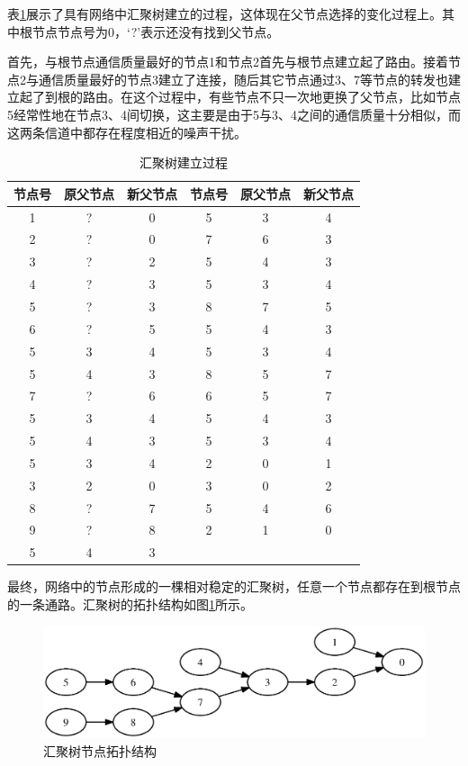 表\ref{ctp-tree-build}展示了具有网络中汇聚树建立的过程，这体现在父节点选择的变化过程上。其中根节点节点号为0，‘?’表示还没有找到父节点。

首先，与根节点通信质量最好的节点1和节点2首先与根节点建立起了路由。接着节点2与通信质量最好的节点3建立了连接，随后其它节点通过3、7等节点的转发也建立起了到根的路由。在这个过程中，有些节点不只一次地更换了父节点，比如节点5经常性地在节点3、4间切换，这主要是由于5与3、4之间的通信质量十分相似，而这两条信道中都存在程度相近的噪声干扰。
\vspace{-20pt}
\begin{table}[ht]
\wuhao
\centering
\caption{\hei 汇聚树建立过程}\label{ctp-tree-build}
\vspace{5pt}
\begin{tabular}{|c|c|c||c|c|c|}
\hline
节点号&原父节点&新父节点&节点号&原父节点&新父节点 \\
\hline
1&?&0& 5&3&4 \\ 
2&?&0& 7&6&3 \\ 
3&?&2& 5&4&3 \\ 
4&?&3& 5&3&4 \\ 
5&?&3& 8&7&5 \\ 
6&?&5& 5&4&3 \\ 
5&3&4& 5&3&4 \\ 
5&4&3& 8&5&7 \\ 
7&?&6& 6&5&7 \\ 
5&3&4& 5&4&3 \\ 
5&4&3& 5&3&4 \\ 
5&3&4& 2&0&1 \\ 
3&2&0& 3&0&2 \\ 
8&?&7& 5&4&6 \\ 
9&?&8& 2&1&0 \\ 
5&4&3&  & &  \\
\hline
\end{tabular}
\xiaosi
\end{table}

最终，网络中的节点形成的一棵相对稳定的汇聚树，任意一个节点都存在到根节点的一条通路。汇聚树的拓扑结构如图\ref{collection-tree}所示。
\begin{figure}[ht]
\centering
\includegraphics[scale=0.6]{figures/topo.eps}
\caption{汇聚树节点拓扑结构}\label{collection-tree}
\end{figure}


